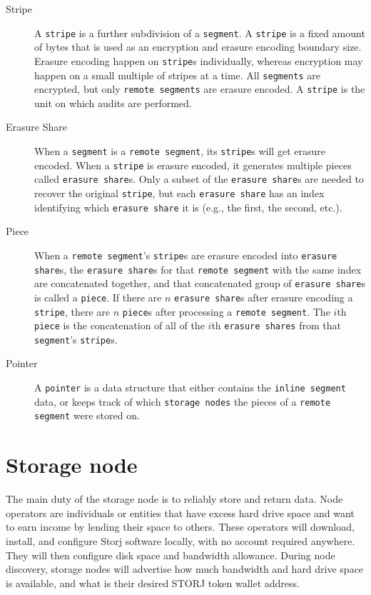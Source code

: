 \documentclass[11pt,fleqn,openany]{book}
\newcommand{\x}[1]{{\tt #1}} \newcommand{\code}[1]{{\em #1}}
\begin{document}
\begin{description}
\item[Stripe] A \x{stripe} is a further subdivision of a \x{segment}. A
\x{stripe} is a fixed amount of bytes that is used as an encryption and erasure
encoding boundary size. Erasure encoding happen on \x{stripe}s individually,
whereas encryption may happen on a small multiple of stripes at a time. All
\x{segments} are encrypted, but only \x{remote segments} are erasure encoded.
A \x{stripe} is the unit on which audits are performed.

\item[Erasure Share] When a \x{segment} is a \x{remote segment}, its \x{stripe}s
will get erasure encoded. When a \x{stripe} is erasure encoded, it generates
multiple pieces called \x{erasure share}s. Only a subset of the \x{erasure
share}s are needed to recover the original \x{stripe}, but each \x{erasure
share} has an index identifying which \x{erasure share} it is (e.g., the first,
the second, etc.).

\item[Piece] When a \x{remote segment}'s \x{stripe}s are erasure encoded into
\x{erasure share}s, the \x{erasure share}s for that \x{remote segment} with the
same index are concatenated together, and that concatenated group of \x{erasure
share}s is called a \x{piece}. If there are $n$ \x{erasure share}s after erasure
encoding a \x{stripe}, there are $n$ \x{piece}s after processing a \x{remote
segment}. The $i$th \x{piece} is the concatenation of all of the $i$th
\x{erasure shares} from that \x{segment}'s \x{stripe}s.

\item[Pointer] A \x{pointer} is a data structure that either contains the
\x{inline segment} data, or keeps track of which
\x{storage nodes} the pieces of a \x{remote segment} were stored on.
\end{description}

\section{Storage node}

The main duty of the storage node is to reliably store and return data.
Node operators
are individuals or entities that have excess hard drive space and want to earn
income by lending their space to others. These operators will
download,
install, and configure Storj software locally, with no account required
anywhere. They will then configure disk space and bandwidth allowance.
During node discovery, storage nodes will advertise how much bandwidth and
hard drive space is available, and what is their desired STORJ token
wallet address.
\end{document}
